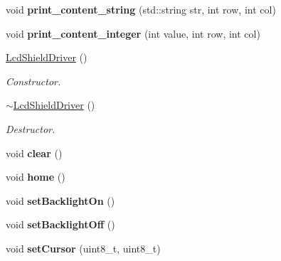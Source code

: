 \begin{DoxyCompactItemize}
void {\bfseries print\+\_\+content\+\_\+string} (std\+::string str, int row, int col)
\item 
\mbox{\label{classLcdShieldDriver_aab9b70b973f0bd1d2076f5144da2f706}} 
void {\bfseries print\+\_\+content\+\_\+integer} (int value, int row, int col)
\item 
\mbox{\label{classLcdShieldDriver_a14d2027ac041be273d6b894a6d66bb1f}} 
\hyperlink{classLcdShieldDriver_a14d2027ac041be273d6b894a6d66bb1f}{Lcd\+Shield\+Driver} ()
\begin{DoxyCompactList}\small\item\em Constructor. \end{DoxyCompactList}\item 
\mbox{\label{classLcdShieldDriver_aaec080d1c36326c1e58642a7e28d85b1}} 
\hyperlink{classLcdShieldDriver_aaec080d1c36326c1e58642a7e28d85b1}{$\sim$\+Lcd\+Shield\+Driver} ()
\begin{DoxyCompactList}\small\item\em Destructor. \end{DoxyCompactList}\item 
\mbox{\label{classLcdShieldDriver_a43e151fc827a4d8d982bc2857b78262e}} 
void {\bfseries clear} ()
\item 
\mbox{\label{classLcdShieldDriver_a7bccc296eef476eb49984bdf8fdebb14}} 
void {\bfseries home} ()
\item 
\mbox{\label{classLcdShieldDriver_a68a86a7407fd3df5714f3351d657e499}} 
void {\bfseries set\+Backlight\+On} ()
\item 
\mbox{\label{classLcdShieldDriver_a81639e7553501343137be8984d7ea7d9}} 
void {\bfseries set\+Backlight\+Off} ()
\item 
\mbox{\label{classLcdShieldDriver_a6733a16dc0e1d58cfdfb4019ea2e6582}} 
void {\bfseries set\+Cursor} (uint8\+\_\+t, uint8\+\_\+t)
\item 
\mbox{\label{classLcdShieldDriver_aea03f93f7dfad9bc185bd77ef059c665}} 

\end{DoxyCompactItemize}
